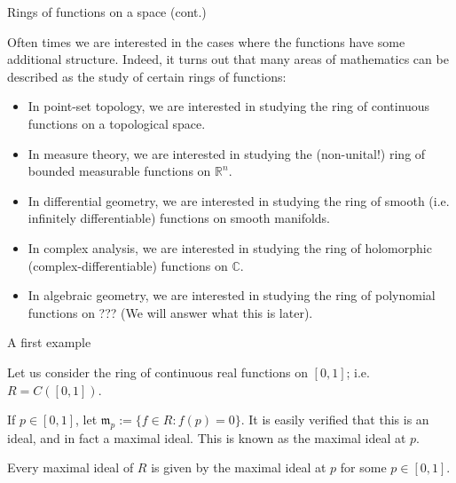 \documentclass[aspectratio=169,10pt]{beamer}
\begin{document}
\begin{frame}{Rings of functions on a space (cont.)}

Often times we are interested in the cases where the functions have some additional structure. Indeed, it turns out that many areas of mathematics can be described as the study of certain rings of functions:

\begin{itemize}
    \item In point-set topology, we are interested in studying the ring of continuous functions on a topological space.
    \item In measure theory, we are interested in studying the (non-unital!) ring of bounded measurable functions on $\mathbb{R}^n$.
    \item In differential geometry, we are interested in studying the ring of smooth (i.e. infinitely differentiable) functions on smooth manifolds.
    \item In complex analysis, we are interested in studying the ring of holomorphic (complex-differentiable) functions on $\mathbb{C}$.
    \item In algebraic geometry, we are interested in studying the ring of polynomial functions on ??? (We will answer what this is later).
\end{itemize}
\vspace{12pt}
\end{frame}


\begin{frame}{A first example}
\begin{example}
    Let us consider the ring of continuous real functions on $[0,1]$; i.e. $R = C([0,1])$.
    \vspace{12pt}
    
    If $p \in [0,1]$, let $\mathfrak{m}_p := \{f \in R : f(p) = 0\}$. It is easily verified that this is an ideal, and in fact a maximal ideal. This is known as the maximal ideal at $p$.
\end{example}

\begin{theorem}
    Every maximal ideal of $R$ is given by the maximal ideal at $p$ for some $p \in [0,1]$.
\end{theorem}
\end{frame}
\end{document}
